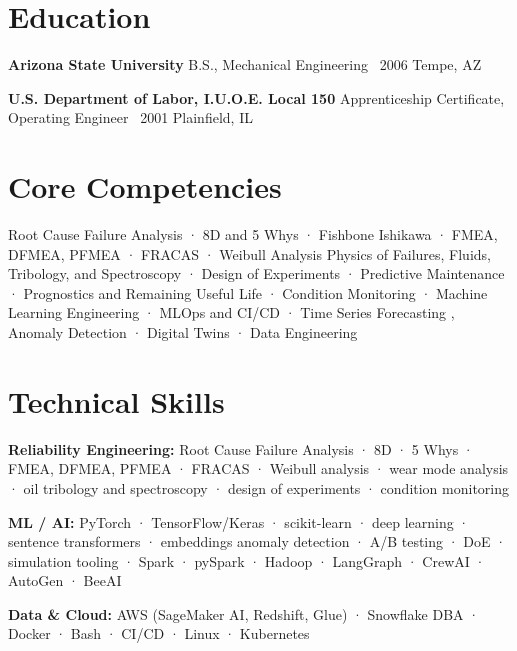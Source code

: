 \documentclass[10pt]{article}
\begin{document}
\section{Education}
\textbf{Arizona State University }\hspace{0.4em}B.S., Mechanical Engineering \textperiodcentered\ 2006 \hfill{\color{slate}\small Tempe, AZ}

\textbf{U.S. Department of Labor, I.U.O.E. Local 150 }\hspace{0.4em}Apprenticeship Certificate, Operating Engineer \textperiodcentered\ 2001 \hfill{\color{slate}\small Plainfield, IL}


\section{Core Competencies}
Root Cause Failure Analysis · 8D and 5 Whys · Fishbone Ishikawa · FMEA, DFMEA, PFMEA · FRACAS · Weibull Analysis 
Physics of Failures, Fluids, Tribology, and Spectroscopy · Design of Experiments · Predictive Maintenance · Prognostics and Remaining Useful Life · Condition Monitoring · Machine Learning Engineering · MLOps and CI/CD · Time Series Forecasting
, Anomaly Detection · Digital Twins · Data Engineering

\section{Technical Skills}

\textbf{Reliability Engineering:}  Root Cause Failure Analysis · 8D · 5 Whys · FMEA, DFMEA, PFMEA · FRACAS · Weibull analysis · wear mode analysis · oil tribology and spectroscopy · design of experiments · condition monitoring

\textbf{ML / AI:} PyTorch · TensorFlow/Keras · scikit-learn · deep learning · sentence transformers · embeddings
anomaly detection · A/B testing · DoE · simulation tooling · Spark · pySpark · Hadoop · LangGraph · CrewAI · AutoGen · BeeAI

\par\smallskip

\textbf{Data \& Cloud:} AWS (SageMaker AI, Redshift, Glue) · Snowflake DBA · Docker · Bash · CI/CD · Linux · Kubernetes
\end{document}
